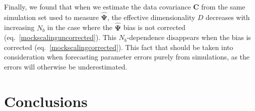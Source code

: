 \documentclass[reprint,aps,prd,superscriptaddress,showkeys,showpacs]{revtex4-1}
\newcommand{\bb}[1]{\mathbf{#1}}
\newcommand{\bbh}[1]{\mathbf{\hat{#1}}}
\begin{document}
Finally, we found that when we estimate the data covariance $\bb{C}$
from the same simulation set used to measure $\bbh{\Psi}$, the
effective dimensionality $D$ decreases with increasing $N_b$ in the
case where the $\bbh{\Psi}$ bias is not corrected
(eq.~\ref{mockscalinguncorrected}).  This $N_b$-dependence disappears
when the bias is corrected (eq.~\ref{mockscalingcorrected}).  This
fact that should be taken into consideration when forecasting
parameter errors purely from simulations, as the errors will otherwise
be underestimated.




\section{Conclusions}
\end{document}
